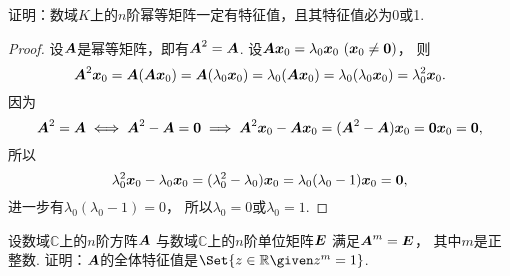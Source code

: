 \begin{example}\label{example:幂等矩阵.幂等矩阵的特征值的性质}
证明：数域\(K\)上的\(n\)阶幂等矩阵一定有特征值，且其特征值必为0或1.
\begin{proof}
设\(\boldsymbol{A}\)是幂等矩阵，即有\(\boldsymbol{A}^2=\boldsymbol{A}\).
设\(\vb{A}\vb{x}_0=\lambda_0\vb{x}_0\ (\vb{x}_0\neq\vb0)\)，
则\begin{equation*}
	\boldsymbol{A}^2\boldsymbol{x}_0
	=\boldsymbol{A}(\boldsymbol{A}\boldsymbol{x}_0)
	=\boldsymbol{A}(\lambda_0\boldsymbol{x}_0)
	=\lambda_0(\boldsymbol{A}\boldsymbol{x}_0)
	=\lambda_0(\lambda_0\boldsymbol{x}_0)
	=\lambda_0^2\boldsymbol{x}_0.
\end{equation*}
因为\begin{equation*}
	\boldsymbol{A}^2=\boldsymbol{A}
	\iff
	\boldsymbol{A}^2-\boldsymbol{A}=\boldsymbol0
	\implies
	\boldsymbol{A}^2\boldsymbol{x}_0-\boldsymbol{A}\boldsymbol{x}_0
	=(\boldsymbol{A}^2-\boldsymbol{A})\boldsymbol{x}_0
	=\boldsymbol0\boldsymbol{x}_0
	=\boldsymbol0,
\end{equation*}
所以\begin{equation*}
	\lambda_0^2\boldsymbol{x}_0-\lambda_0\boldsymbol{x}_0
	=(\lambda_0^2-\lambda_0)\boldsymbol{x}_0
	=\lambda_0(\lambda_0-1)\boldsymbol{x}_0
	=\boldsymbol0,
\end{equation*}
进一步有\(\lambda_0(\lambda_0-1)=0\)，
所以\(\lambda_0=0\)或\(\lambda_0=1\).
\end{proof}
\end{example}

\begin{example}
设数域\(\mathbb{C}\)上的\(n\)阶方阵\(\boldsymbol{A}\)
与数域\(\mathbb{C}\)上的\(n\)阶单位矩阵\(\boldsymbol{E}\)
满足\(\boldsymbol{A}^m=\boldsymbol{E}\)，
其中\(m\)是正整数.
证明：\(\boldsymbol{A}\)的全体特征值是\(\Set{ z\in\mathbb{R} \given z^m = 1 }\).
\end{example}

